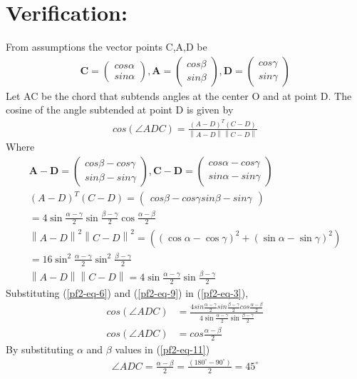 \documentclass[12pt]{article}
\providecommand{\norm}[1]{\left\lVert#1\right\rVert}
\newcommand{\myvec}[1]{\ensuremath{\begin{pmatrix}#1\end{pmatrix}}}
\let\vec\mathbf
\begin{document}
\section*{Verification:}
From assumptions the vector points C,A,D be
\begin{align}
	\vec{C} = \myvec{cos\alpha\\sin\alpha},
	\vec{A} = \myvec{cos\beta\\sin\beta},
	\vec{D} = \myvec{cos\gamma\\sin\gamma}
\end{align}
Let AC be the chord that subtends angles at the center O and at point D. The cosine of the angle subtended at point D is given by
\begin{align}
	cos(\angle ADC) = \frac{(A-D)^T(C-D)}{\norm{A-D}\norm{C-D}}
	\label{pf2-eq-3}
\end{align}
Where
 \begin{align}
	\vec{A-D} = \myvec{cos\beta - cos\gamma\\sin\beta - sin\gamma},
	\vec{C-D} = \myvec{cos\alpha - cos\gamma\\sin\alpha - sin\gamma}\\
	(A-D)^T(C-D)=\myvec{cos\beta - cos\gamma  sin\beta - sin\gamma}\\
	\label{pf2-eq-6}
	= 4\sin\frac{\alpha-\gamma}2\sin\frac{\beta-\gamma}2\cos\frac{\alpha-\beta}2\\
	\norm{A-D}^2\norm{C-D}^2 = ((\cos\alpha-\cos\gamma)^2+(\sin\alpha-\sin\gamma)^2)\\
	= 16 \sin^2\frac{\alpha-\gamma}2\sin^2\frac{\beta-\gamma}2\\
	\norm{A-D}\norm{C-D} = 4 \sin\frac{\alpha-\gamma}2\sin\frac{\beta-\gamma}2
	\label{pf2-eq-9}
\end{align}
Substituting (\ref{pf2-eq-6}) and (\ref{pf2-eq-9}) in (\ref{pf2-eq-3}),
\begin{align}
	cos(\angle ADC) &= \frac{4sin\frac{\alpha-\gamma}{2}sin\frac{\beta-\gamma}{2}cos\frac{\alpha-\beta}{2}}{4 \sin\frac{\alpha-\gamma}2\sin\frac{\beta-\gamma}2}\\
	cos(\angle ADC) &= cos\frac{\alpha-\beta}{2}
	\label{pf2-eq-11}
\end{align}
By substituting $\alpha$ and $\beta$ values in (\ref{pf2-eq-11})
\begin{align}
\angle ADC = \frac{\alpha-\beta}{2}=\frac{(180^\circ - 90^\circ )}{2}=45^\circ
\end{align}
\end{document}

